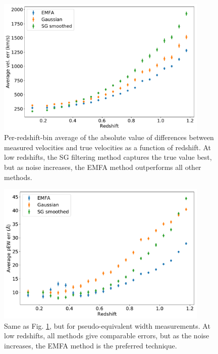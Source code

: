 \begin{figure}[htbp]
    \centering
    \includegraphics[width=0.9\textwidth]{figures/si_feat_pca/wfirst_vel_err.pdf}
    \caption{Per-redshift-bin average of the absolute value of differences between measured velocities and true velocities as a function of redshift. At low redshifts, the SG filtering method captures the true value best, but as noise increases, the EMFA method outperforms all other methods.}
    \label{wfirst_vel_err_vs_z}
\end{figure}

\begin{figure}[htbp]
    \centering
    \includegraphics[width=0.9\textwidth]{figures/si_feat_pca/wfirst_pew_err.pdf}
    \caption{Same as Fig. \ref{wfirst_vel_err_vs_z}, but for pseudo-equivalent width measurements. At low redshifts, all methods give comparable errors, but as the noise increases, the EMFA method is the preferred technique.}
    \label{wfirst_ew_err_vs_z}
\end{figure}

